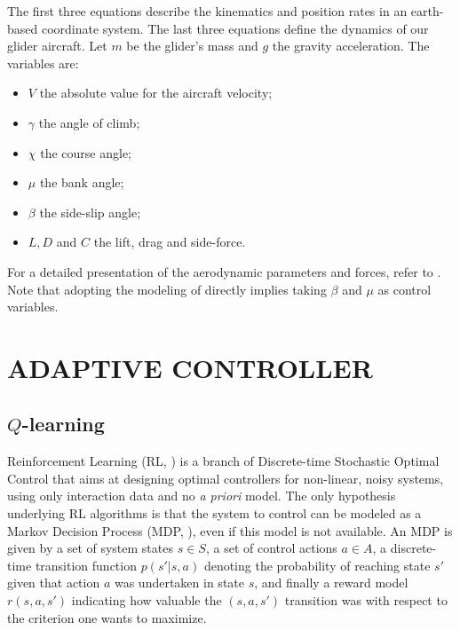 \documentclass[a4paper, 10pt, conference]{ieeeconf}
\begin{document}
The first three equations describe the kinematics and position rates in an earth-based coordinate system. The last three equations define the dynamics of our glider aircraft. Let $m$ be the glider's mass and $g$ the gravity acceleration. The variables are:
\begin{itemize}
\item $V$ the absolute value for the aircraft velocity;
\item $\gamma$ the angle of climb;
\item $\chi$ the course angle;
\item $\mu$ the bank angle;
\item $\beta$ the side-slip angle;
\item $L, D $ and $C$ the lift, drag and side-force.
\end{itemize}

For a detailed presentation of the aerodynamic parameters and forces, refer to \cite{dynamic}.
Note that adopting the modeling of \cite{dynamic} directly implies taking $\beta$ and $\mu$ as control variables.

\section{ADAPTIVE CONTROLLER}
\label{sec:control}

\subsection{$Q$-learning}

Reinforcement Learning (RL, \cite{sutton_book}) is a branch of Discrete-time Stochastic Optimal Control that aims at designing optimal controllers for non-linear, noisy systems, using only interaction data and no \emph{a priori} model. The only hypothesis underlying RL algorithms is that the system to control can be modeled as a Markov Decision Process (MDP, \cite{puterman}), even if this model is not available. An MDP is given by a set of system states $s\in S$, a set of control actions $a\in A$, a discrete-time transition function $p(s'|s,a)$ denoting the probability of reaching state $s'$ given that action $a$ was undertaken in state $s$, and finally a reward model $r(s,a,s')$ indicating how valuable the $(s,a,s')$ transition was with respect to the criterion one wants to maximize.
\end{document}
